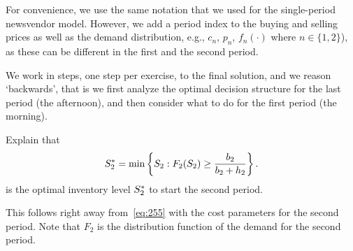 For convenience, we use the same notation that we used for the single-period newsvendor model. However, we add a period index to the buying and selling prices as well as the demand distribution, e.g.,  $c_n$, $p_{n}$, $f_n(\cdot)$ where $n\in\{1,2\}$), as these can be different in the first and the second period. 

We work in steps, one step per exercise, to the final solution, and we reason `backwards', that is we first analyze the optimal decision structure for the last period (the afternoon), and then consider what to do for the first period (the morning).

\begin{exercise} Explain that 
\begin{align*}
S^*_2 = \min\left\{S_2 : F_2(S_2)\geq \frac{b_2}{b_2+h_2}\right\}.
\end{align*}
is the optimal inventory level $S_2^*$ to  start the second period.
\begin{solution}
This follows right away from~\eqref{eq:255} with the cost parameters for the second period. Note that  $F_2$ is the distribution function of the demand for the second period.
\end{solution}
\end{exercise}


